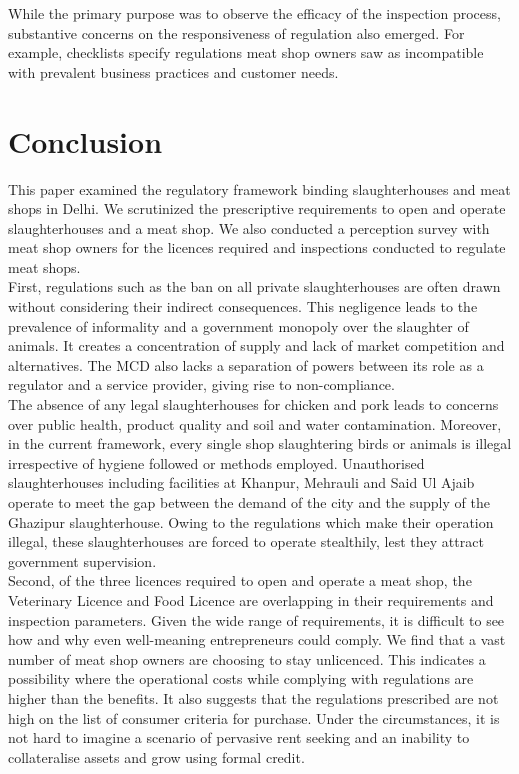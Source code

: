 \documentclass[a4paper, 12pt]{article}
\begin{document}
While the primary purpose was to observe the efficacy of the inspection process, substantive concerns on the responsiveness of regulation also emerged. For example, checklists specify regulations meat shop owners saw as incompatible with prevalent business practices and customer needs. \\

\section{Conclusion}

This paper examined the regulatory framework binding slaughterhouses and meat shops in Delhi. We scrutinized the prescriptive requirements to open and operate slaughterhouses and a meat shop. We also conducted a perception survey with meat shop owners for the licences required and inspections conducted to regulate meat shops.\\ 

First, regulations such as the ban on all private slaughterhouses are often drawn without considering their indirect consequences. This negligence leads to the prevalence of informality and a government monopoly over the slaughter of animals. It creates a concentration of supply and lack of market competition and alternatives. The MCD also lacks a separation of powers between its role as a regulator and a service provider, giving rise to non-compliance.\\

The absence of any legal slaughterhouses for chicken and pork leads to concerns over public health, product quality and soil and water contamination. Moreover, in the current framework, every single shop slaughtering birds or animals is illegal irrespective of hygiene followed or methods employed. Unauthorised slaughterhouses including facilities at Khanpur, Mehrauli and Said Ul Ajaib operate to meet the gap between the demand of the city and the supply of the Ghazipur slaughterhouse. Owing to the regulations which make their operation illegal, these slaughterhouses are forced to operate stealthily, lest they attract government supervision. \\

Second, of the three licences required to open and operate a meat shop, the Veterinary Licence and Food Licence are overlapping in their requirements and inspection parameters. Given the wide range of requirements, it is difficult to see how and why even well-meaning entrepreneurs could comply. We find that a vast number of meat shop owners are choosing to stay unlicenced. This indicates a possibility where the operational costs while complying with regulations are higher than the benefits. It also suggests that the regulations prescribed are not high on the list of consumer criteria for purchase. Under the circumstances, it is not hard to imagine a scenario of pervasive rent seeking and an inability to collateralise assets and grow using formal credit. \\
\end{document}
